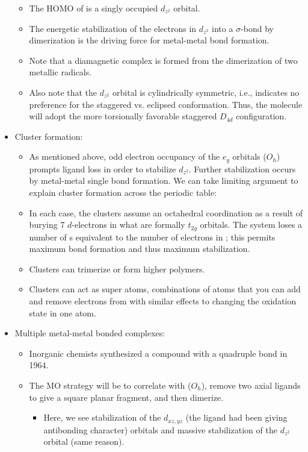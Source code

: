 \documentclass[../notes.tex]{subfiles}
\begin{document}
\begin{itemize}
\begin{itemize}
        \item The HOMO of  is a singly occupied $d_{z^2}$ orbital.
        \item The energetic stabilization of the electrons in $d_{z^2}$ into a $\sigma$-bond by dimerization is the driving force for metal-metal bond formation.
        \item Note that a diamagnetic complex is formed from the dimerization of two metallic radicals.
        \item Also note that the $d_{z^2}$ orbital is cylindrically symmetric, i.e., indicates no preference for the staggered vs. eclipsed conformation. Thus, the molecule will adopt the more torsionally favorable staggered $D_{4d}$ configuration.
    \end{itemize}
    \item Cluster formation:
    \begin{itemize}
        \item As mentioned above, odd electron occupancy of the $e_g$ orbitals ($O_h$) prompts ligand loss in order to stabilize $d_{z^2}$. Further stabilization occurs by metal-metal single bond formation. We can take limiting argument to explain cluster formation across the periodic table:
        \item In each case, the clusters assume an octahedral coordination as a result of burying 7 $d$-electrons in what are formally $t_{2g}$ orbitals. The system loses a number of s equivalent to the number of electrons in ; this permits maximum  bond formation and thus maximum stabilization.
        \item Clusters can trimerize or form higher polymers.
        \item Clusters can act as super atoms, combinations of atoms that you can add and remove electrons from with similar effects to changing the oxidation state in one atom.
    \end{itemize}
    \item Multiple metal-metal bonded complexes:
    \begin{itemize}
        \item Inorganic chemists synthesized a compound with a quadruple bond in 1964.
        \item The MO strategy will be to correlate  with  ($O_h$), remove two axial  ligands to give a square planar  fragment, and then dimerize.
        \begin{itemize}
            \item Here, we see stabilization of the $d_{xz,yz}$ (the  ligand had been giving antibonding character) orbitals and massive stabilization of the $d_{z^2}$ orbital (same reason).

\end{itemize}
\end{itemize}
\end{itemize}
\end{document}
